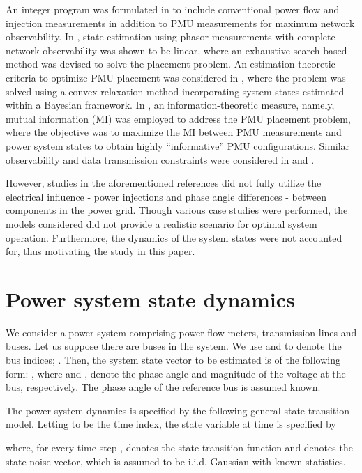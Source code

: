 \documentclass[10pt,journal,twocolumn]{IEEEtran}\IEEEoverridecommandlockouts
\newcommand{\iid}{i.i.d.}
\begin{document}
An integer program was formulated in \cite{Xu2004} to include conventional power flow and injection measurements in addition to PMU measurements for maximum network observability. In \cite{Azizi2012}, state estimation using phasor measurements with complete network observability was shown to be linear, where an exhaustive search-based method was devised to solve the placement problem. An estimation-theoretic criteria to optimize PMU placement was considered in \cite{Kekatos2012}, where the problem was solved using a convex relaxation method incorporating system states estimated within a Bayesian framework. In \cite{Li2013}, an information-theoretic measure, namely, mutual information (MI) was employed to address the PMU placement problem, where the objective was to maximize the MI between PMU measurements and power system states to obtain highly ``informative'' PMU configurations. Similar observability and data transmission constraints were considered in \cite{Fesharaki2013} and \cite{Anderson2014}.

However, studies in the aforementioned references did not fully utilize the electrical influence - power injections and phase angle differences - between components in the power grid. Though various case studies were performed, the models considered did not provide a realistic scenario for optimal system operation. Furthermore, the dynamics of the system states were not accounted for, thus motivating the study in this paper.

\section{Power system state dynamics}\label{sec:state_dynamics}
We consider a power system comprising power flow meters, transmission lines and buses. Let us suppose there are  buses in the system. We use  and  to denote the bus indices; . Then, the system state vector to be estimated is of the following form: , where  and , denote the phase angle and  magnitude of the voltage at the  bus, respectively. The phase angle  of the reference bus is assumed known.

The power system dynamics is specified by the following general state transition model. Letting  to be the time index, the state variable at time  is specified by

where, for every time step ,  denotes the state transition function and  denotes the state noise vector, which is assumed to be {\iid} Gaussian with known statistics.
\end{document}
